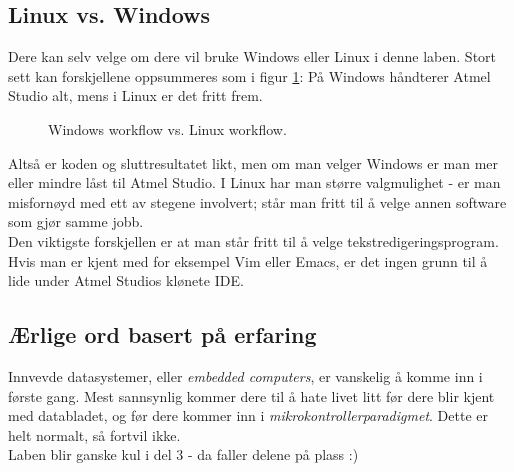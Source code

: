 \documentclass[11pt,a4paper]{article}
\begin{document}
\subsection{Linux vs. Windows}
Dere kan selv velge om dere vil bruke Windows eller Linux i denne laben. Stort sett kan forskjellene oppsummeres som i figur \ref{Win::vs:Linux}: På Windows håndterer Atmel Studio alt, mens i Linux er det fritt frem.
\begin{figure}
\centering
{}
\caption{Windows workflow vs. Linux workflow.}
\label{Win::vs:Linux}
\end{figure}
Altså er koden og sluttresultatet likt, men om man velger Windows er man mer eller mindre låst til Atmel Studio. I Linux har man større valgmulighet - er man misfornøyd med ett av stegene involvert; står man fritt til å velge annen software som gjør samme jobb.\\
Den viktigste forskjellen er at man står fritt til å velge tekstredigeringsprogram. Hvis man er kjent med for eksempel Vim eller Emacs, er det ingen grunn til å lide under Atmel Studios klønete IDE.
\subsection{Ærlige ord basert på erfaring}
Innvevde datasystemer, eller \textit{embedded computers}, er vanskelig å komme inn i første gang. Mest sannsynlig kommer dere til å hate livet litt før dere blir kjent med databladet, og før dere kommer inn i \textit{mikrokontrollerparadigmet}. Dette er helt normalt, så fortvil ikke.\\
Laben blir ganske kul i del 3 - da faller delene på plass :)
\end{document}
